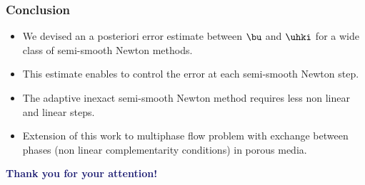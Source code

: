 \documentclass[10 pt]{beamer}
\begin{document}
\begin{frame}
\frametitle{Conclusion}
\begin{itemize}
\item
We devised an a posteriori error estimate between $\bu$ and $\uhki$ for a wide class of semi-smooth Newton methods.
\vspace{0.5 cm}

\item 
This estimate enables to control the error at each semi-smooth Newton step.
\vspace{0.5 cm}
\item
The adaptive inexact semi-smooth Newton method requires less non linear and linear steps. 
\vspace{0.5 cm}
\item
Extension of this work to  multiphase flow problem with exchange between phases (non linear complementarity conditions) in porous media.  
\end{itemize}
\vspace{1 cm}
\Large
\hspace{1.8 cm}
\textcolor{midnightblue}
{\textbf{
Thank you for your attention!}}
\end{frame}
%
\end{document}
